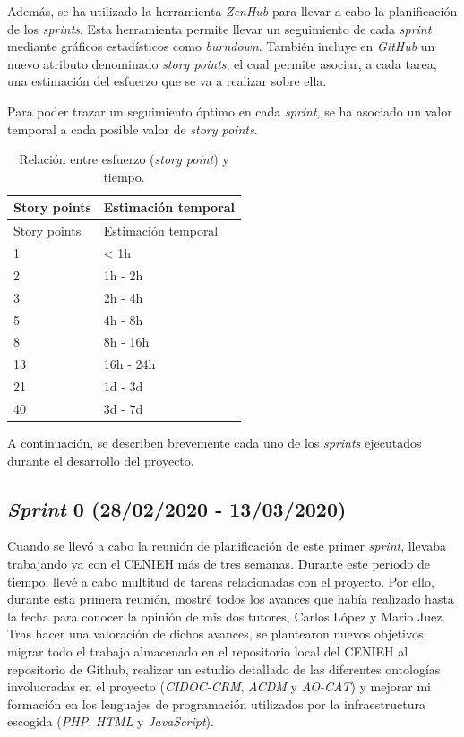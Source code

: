 \documentclass[
]{article}
\begin{document}
Además, se ha utilizado la herramienta \emph{ZenHub} para llevar a cabo
la planificación de los \emph{sprints}. Esta herramienta permite llevar
un seguimiento de cada \emph{sprint} mediante gráficos estadísticos como
\emph{burndown}. También incluye en \emph{GitHub} un nuevo atributo
denominado \emph{story points}, el cual permite asociar, a cada tarea,
una estimación del esfuerzo que se va a realizar sobre ella.

Para poder trazar un seguimiento óptimo en cada \emph{sprint}, se ha
asociado un valor temporal a cada posible valor de \emph{story points}.

\begin{longtable}[]{@{}ll@{}}
\caption{Relación entre esfuerzo (\emph{story point}) y
tiempo.}\tabularnewline
\toprule
Story points & Estimación temporal\tabularnewline
\midrule
\endfirsthead
\toprule
Story points & Estimación temporal\tabularnewline
\midrule
\endhead
1 & \textless{} 1h\tabularnewline
2 & 1h - 2h\tabularnewline
3 & 2h - 4h\tabularnewline
5 & 4h - 8h\tabularnewline
8 & 8h - 16h\tabularnewline
13 & 16h - 24h\tabularnewline
21 & 1d - 3d\tabularnewline
40 & 3d - 7d\tabularnewline
\bottomrule
\end{longtable}

A continuación, se describen brevemente cada uno de los \emph{sprints}
ejecutados durante el desarrollo del proyecto.

\hypertarget{sprint-0-28022020---13032020}{%
\subsection{\texorpdfstring{\emph{Sprint} 0 (28/02/2020 -
13/03/2020)}{Sprint 0 (28/02/2020 - 13/03/2020)}}\label{sprint-0-28022020---13032020}}

Cuando se llevó a cabo la reunión de planificación de este primer
\emph{sprint}, llevaba trabajando ya con el CENIEH más de tres semanas.
Durante este periodo de tiempo, llevé a cabo multitud de tareas
relacionadas con el proyecto. Por ello, durante esta primera reunión,
mostré todos los avances que había realizado hasta la fecha para conocer
la opinión de mis dos tutores, Carlos López y Mario Juez. Tras hacer una
valoración de dichos avances, se plantearon nuevos objetivos: migrar
todo el trabajo almacenado en el repositorio local del CENIEH al
repositorio de Github, realizar un estudio detallado de las diferentes
ontologías involucradas en el proyecto (\emph{CIDOC-CRM}, \emph{ACDM} y
\emph{AO-CAT}) y mejorar mi formación en los lenguajes de programación
utilizados por la infraestructura escogida (\emph{PHP}, \emph{HTML} y
\emph{JavaScript}).
\end{document}
